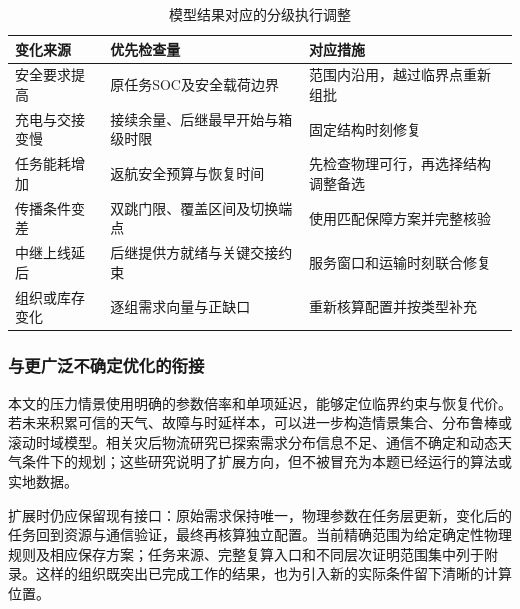 \begin{table}[htbp]\centering\small
\caption{模型结果对应的分级执行调整}\label{tab:execution_policy}
\begin{tabularx}{\linewidth}{>{\raggedright\arraybackslash}p{2.2cm}LL}\toprule
变化来源 & 优先检查量 & 对应措施\\\midrule
安全要求提高 & 原任务SOC及安全载荷边界 & 范围内沿用，越过临界点重新组批\\
充电与交接变慢 & 接续余量、后继最早开始与箱级时限 & 固定结构时刻修复\\
任务能耗增加 & 返航安全预算与恢复时间 & 先检查物理可行，再选择结构调整备选\\
传播条件变差 & 双跳门限、覆盖区间及切换端点 & 使用匹配保障方案并完整核验\\
中继上线延后 & 后继提供方就绪与关键交接约束 & 服务窗口和运输时刻联合修复\\
组织或库存变化 & 逐组需求向量与正缺口 & 重新核算配置并按类型补充\\\bottomrule
\end{tabularx}\end{table}

\subsubsection{与更广泛不确定优化的衔接}
本文的压力情景使用明确的参数倍率和单项延迟，能够定位临界约束与恢复代价。若未来积累可信的天气、故障与时延样本，可以进一步构造情景集合、分布鲁棒或滚动时域模型。相关灾后物流研究已探索需求分布信息不足、通信不确定和动态天气条件下的规划\cite{xin2025,dukkanci2026,li2025hurricane,zhang2026communication}；这些研究说明了扩展方向，但不被冒充为本题已经运行的算法或实地数据。

扩展时仍应保留现有接口：原始需求保持唯一，物理参数在任务层更新，变化后的任务回到资源与通信验证，最终再核算独立配置。当前精确范围为给定确定性物理规则及相应保存方案；任务来源、完整复算入口和不同层次证明范围集中列于附录。这样的组织既突出已完成工作的结果，也为引入新的实际条件留下清晰的计算位置。

